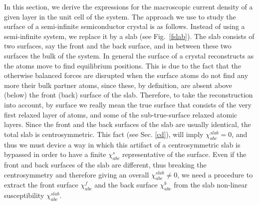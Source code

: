 \documentclass[floatfix,prb,aps,superscriptaddress,11pt,preprint]{revtex4}
\begin{document}
In this section, we derive the expressions for the macroscopic current
density of a given layer in the unit cell of the system.
The approach we use to study the surface of a semi-infinite
semiconductor crystal is as follows. Instead of using a
semi-infinite system, we replace it by a slab (see Fig.~\ref{fslab}).
The slab consists of
two surfaces, say the front and the back surface, and in between these
two surfaces the bulk of the system. 
In
general the surface of a crystal reconstructs as the atoms
move to find equilibrium positions. This is due to the fact that
the otherwise
balanced forces are disrupted when the surface atoms do not find any
more their bulk partner atoms, since these, by definition, are absent
above (below) the front (back) surface of the slab. 
Therefore, to take the reconstruction into account, by surface we really mean
the true surface that consists of the very first relaxed layer of atoms, and
some of the sub-true-surface relaxed atomic layers.
Since the front and the back
surfaces of the slab are usually identical, the total slab is
centrosymmetric. This fact (see Sec. \ref{cd}), will imply $\chi^{slab}_{abc}=0$, and thus we must
device a way in which this artifact of a centrosymmetric slab is
bypassed in order to have a finite $\chi^s_{abc}$ representative of the
surface. Even if the front and back surfaces of the slab 
are different, thus breaking the centrosymmetry and therefore giving an
overall $\chi^{slab}_{abc}\ne 0$, we
need a procedure to extract the front surface $\chi^f_{abc}$
and
the back surface $\chi^b_{abc}$ from the slab non-linear
susceptibility $\chi^{slab}_{abc}$.
\end{document}
